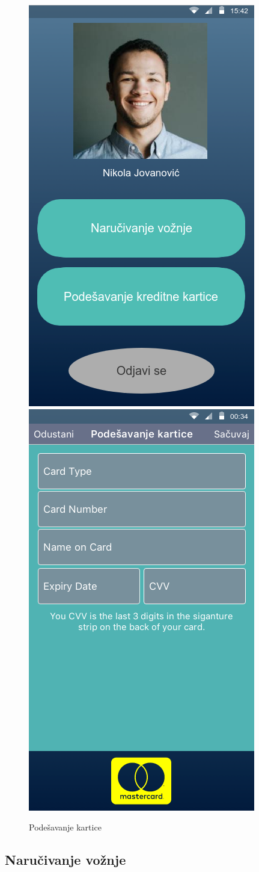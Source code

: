 \begin{figure}[h!]
\centering
\begin{minipage}{.5\textwidth}
  \centering
  \includegraphics[width=.4\linewidth]{Slike/Profil.png}
  \caption{Profil korisnika}
  \label{fig:Profil korisnika}
\end{minipage}%
\begin{minipage}{.5\textwidth}
  \centering
  \includegraphics[width=.4\linewidth]{Slike/upravljanje_karticom.png}
   \caption{Podešavanje kartice}{}
  \label{fig:Podešavanje kartice}
\end{minipage}
\end{figure}


\subsection{\bfseries Naručivanje vožnje}
\label{Naručivanje vožnje}

